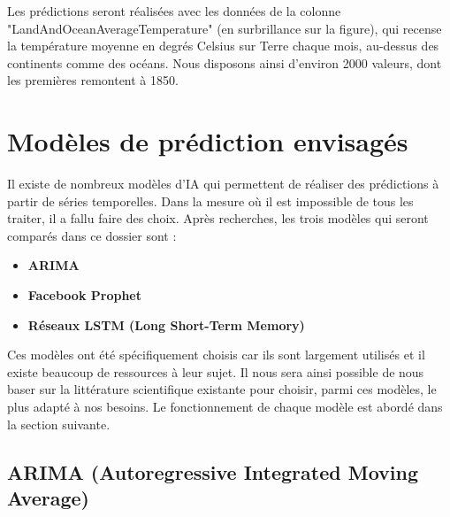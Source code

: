 \documentclass[french]{article}
\begin{document}
    Les prédictions seront réalisées avec les données de la colonne "LandAndOceanAverageTemperature" (en surbrillance sur la figure), qui recense la température moyenne en degrés Celsius sur Terre chaque mois, au-dessus des continents comme des océans. Nous disposons ainsi d'environ 2000 valeurs, dont les premières remontent à 1850.
    \section{Modèles de prédiction envisagés}

    Il existe de nombreux modèles d'IA qui permettent de réaliser des prédictions à partir de séries temporelles. Dans la mesure où il est impossible de tous les traiter, il a fallu faire des choix. Après recherches, les trois modèles qui seront comparés dans ce dossier sont :
    \begin{itemize}
        \item \textbf{ARIMA}
        \item \textbf{Facebook Prophet}
        \item \textbf{Réseaux LSTM (Long Short-Term Memory)}
    \end{itemize} 
    
    Ces modèles ont été spécifiquement choisis car ils sont largement utilisés et il existe beaucoup de ressources à leur sujet. Il nous sera ainsi possible de nous baser sur la littérature scientifique existante pour choisir, parmi ces modèles, le plus adapté à nos besoins. Le fonctionnement de chaque modèle est abordé dans la section suivante.

    \subsection{ARIMA (Autoregressive Integrated Moving Average)}
\end{document}
